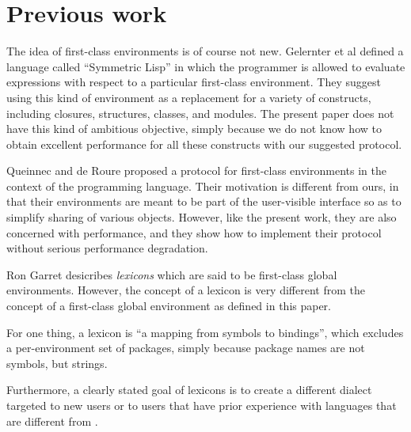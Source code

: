 \section{Previous work}

The idea of first-class environments is of course not new.
Gelernter et al \cite{Gelernter:1987:EFC:41625.41634} defined a
language called ``Symmetric Lisp'' in which the programmer is allowed
to evaluate expressions with respect to a particular first-class
environment.  They suggest using this kind of environment as a
replacement for a variety of constructs, including closures,
structures, classes, and modules.  The present paper does not have
this kind of ambitious objective, simply because we do not know how to
obtain excellent performance for all these constructs with our
suggested protocol.

Queinnec and de Roure \cite{Queinnec:1996:SCT:232627.232653} proposed
a protocol for first-class environments in the context of the
\scheme{} programming language.  Their motivation is different from
ours, in that their environments are meant to be part of the
user-visible interface so as to simplify sharing of various objects.
However, like the present work, they are also concerned with
performance, and they show how to implement their protocol without
serious performance degradation.

Ron Garret desicribes \emph{lexicons} which are said to be first-class
global environments.  However, the concept of a lexicon is very
different from the concept of a first-class global environment as
defined in this paper.

For one thing, a lexicon is ``a mapping from symbols to bindings'',
which excludes a per-environment set of packages, simply because
package names are not symbols, but strings.

Furthermore, a clearly stated goal of lexicons is to create a
different \lisp{} dialect targeted to new users or to users that have
prior experience with languages that are different from \lisp{}.

